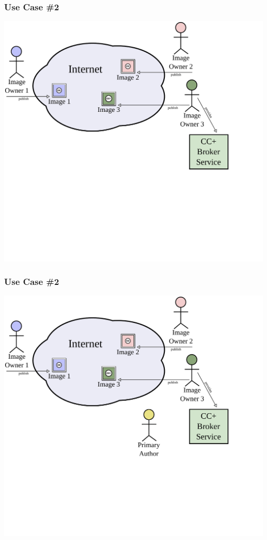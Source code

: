 \documentclass[mathserif,xcolor=dvipsnames,hyperref={bookmarks=true}]{beamer}
\begin{document}
    \begin{frame}[t]
        \frametitle{Use Case \#2}
        \begin{center}
            \includegraphics[width=0.9\textheight]{../resources/usecases/usecase2/usecase2-step12.pdf}
        \end{center}
    \end{frame}
    \begin{frame}[t]
        \frametitle{Use Case \#2}
        \begin{center}
            \includegraphics[width=0.9\textheight]{../resources/usecases/usecase2/usecase2-step13.pdf}
        \end{center}
    \end{frame}
\end{document}

